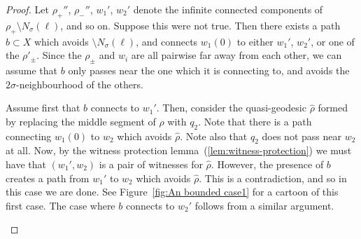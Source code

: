 \documentclass[11pt,a4paper]{amsart}
\theoremstyle{definition}
\begin{document}
\begin{proof}
    
Let $\rho_+''$, $\rho_-''$, $w_1'$, $w_2'$ denote the infinite connected components of $\rho_+ \setminus N_{\sigma}(\ell)$, and so on. 
        Suppose this were not true. Then there exists a path $b \subset X$ which avoids $\setminus N_{\sigma}(\ell)$, and connects $w_1(0)$ to either $w_1'$, $w_2'$, or one of the $\rho'_\pm$. Since the $\rho_\pm$ and $w_i$ are all pairwise far away from each other, we can assume that $b$ only passes near the one which it is connecting to, and avoids the $2\sigma$-neighbourhood of the others. 

        Assume first that $b$ connects to $w_1'$. Then, consider the quasi-geodesic $\hat \rho$ formed by replacing the middle segment of $\rho$ with $q_2$. Note that there is a path connecting $w_1(0)$ to $w_2$ which avoids $\hat \rho$. Note also that $q_2$ does not pass near $w_2$ at all. Now, by the witness protection lemma~(\ref{lem:witness-protection}) we must have that $(w_1', w_2)$ is a pair of witnesses for $\hat \rho$. However, the presence of $b$ creates a path from  $w_1'$ to $w_2$ which avoids $\hat \rho$. This is a contradiction, and so in this case we are done. See Figure~\ref{fig:An bounded case1} for a cartoon of this first case. The case where $b$ connects to $w_2'$ follows from a similar argument. 

        \begin{figure}[ht]
            \centering



\begin{tikzpicture}[x=0.75pt,y=0.75pt,yscale=-1,xscale=1]


\end{tikzpicture}
\end{figure}
\end{proof}
\end{document}
